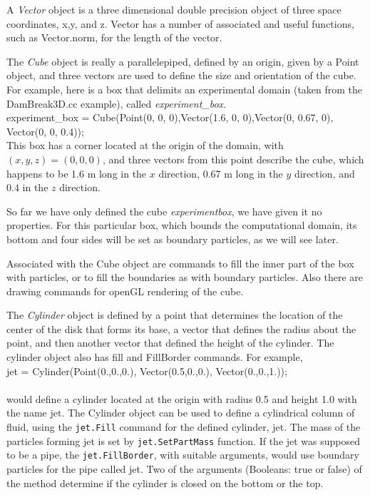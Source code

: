\documentclass[12pt]{memoir}
\begin{document}
A {\em Vector} object is a three dimensional double precision object of
three space coordinates, x,y, and z. Vector has a number of associated
and useful functions, such as Vector.norm, for the length of the vector.


The {\em Cube} object is really a parallelepiped, defined by an origin,
given by a Point object, and three vectors are used to define the size
and orientation of the cube. For example, here is a box that delimits
an experimental domain (taken from the DamBreak3D.cc example), called
{\em experiment\_box.} \\

\noindent experiment\_box = Cube(Point(0, 0, 0),Vector(1.6, 0,
0),Vector(0, 0.67, 0), Vector(0, 0, 0.4));\\

This box has a corner located at the origin of the domain, with $(x, y,
z) = (0,0,0)$, and three vectors from this point describe the cube,
which happens to be 1.6 m long in the $x$ direction, 0.67 m long in the
$y$ direction, and $0.4$ in the $z$ direction.

So far we have only defined the cube {\em experiment\-box}, we have
given it no properties. For this particular box, which bounds the
computational domain, its bottom and four sides will be set as boundary
particles, as we will see later.

Associated with the Cube object are commands to fill the inner part of
the box with particles, or to fill the boundaries as with boundary
particles. Also there are drawing commands for openGL rendering of the
cube.


The {\em Cylinder} object is defined by a point that determines the
location of the center of the disk that forms its base, a vector that
defines the radius about the point, and then another vector that defined
the height of the cylinder. The cylinder object also has fill and
FillBorder commands. For example, \\

jet = Cylinder(Point(0.,0.,0.), Vector(0.5,0.,0.), Vector(0.,0.,1.));\\
\\would define a cylinder located at the origin with radius 0.5 and
height 1.0 with the name jet. The Cylinder object can be used to
define a cylindrical column of fluid, using the \verb!jet.Fill!
command for the defined cylinder, jet. The mass of the particles
forming jet is set by \verb!jet.SetPartMass! function. If the jet was
supposed to be a pipe, the \verb!jet.FillBorder!, with suitable
arguments, would use boundary particles for the pipe called jet. Two
of the arguments (Booleans: true or false) of the method determine if
the cylinder is closed on the bottom or the top.
\end{document}
